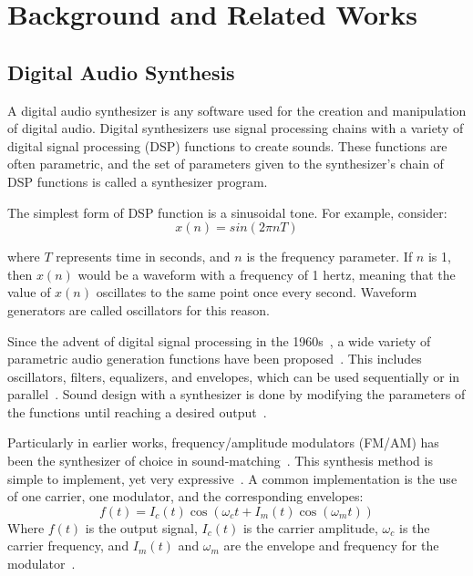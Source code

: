 \section{Background and Related Works}


\subsection{Digital Audio Synthesis}
\label{sec:dsp}
A digital audio synthesizer is any software used for the creation and manipulation of digital audio. Digital synthesizers use signal processing chains with a variety of digital signal processing (\gls{DSP}) functions to create sounds. These functions are often parametric, and the set of parameters given to the synthesizer's chain of DSP functions is called a synthesizer program.

The simplest form of DSP function is a sinusoidal tone. For example, consider:
\[ x(n) = sin( 2\pi n T)\]

where $T$ represents time in seconds, and $n$ is the frequency parameter. If $n$ is 1, then $x(n)$ would be a waveform with a frequency of 1 hertz, meaning that the value of $x(n)$ oscillates to the same point once every second. Waveform generators are called oscillators for this reason. 

Since the advent of digital signal processing in the 1960s~\cite{stranneby2004digital}, a wide variety of parametric audio generation functions have been proposed~\cite{lyons1997understanding,russ1999sound,shier2020spiegelib}. This includes oscillators, filters, equalizers, and envelopes, which can be used sequentially or in parallel~\cite{lyons1997understanding,russ1999sound}. Sound design with a synthesizer is done by modifying the parameters of the functions until reaching a desired output~\cite{roads1996computer,pinch2004analog}.

Particularly in earlier works, frequency/amplitude modulators (\gls{FM}/\gls{AM}) has been the synthesizer of choice in sound-matching~\cite{horner1993machine,mitchell2007evolutionary,vahidi2023mesostructures}. This synthesis method is simple to implement, yet very expressive~\cite{chowning1973synthesis}. A common implementation is the use of one carrier, one modulator, and the corresponding envelopes:
\[ f(t) = I_c(t) \cos(\omega_c t + I_m(t) \cos(\omega_m t))
\]
Where $f(t)$ is the output signal, $I_c(t)$ is the carrier amplitude, $\omega_c$ is the carrier frequency, and $I_m(t)$ and $\omega_m$ are the envelope and frequency for the modulator~\cite{justice1979analytic}. 

